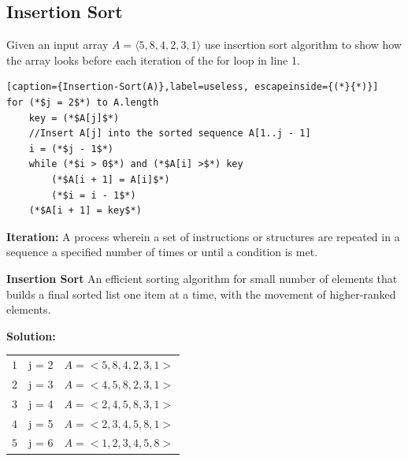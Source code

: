 \documentclass[11pt,fleqn]{book}
\begin{document}
\subsection{Insertion Sort}
\begin{example}
Given an input array $A = \langle 5,8,4,2,3,1 \rangle$ use insertion sort  algorithm to show how the array looks before each iteration of the for loop in line 1. 
\end{example}
\vspace{1em}
\begin{lstlisting}[caption={Insertion-Sort(A)},label=useless, escapeinside={(*}{*)}]
for (*$j = 2$*) to A.length
    key = (*$A[j]$*)
    //Insert A[j] into the sorted sequence A[1..j - 1]
    i = (*$j - 1$*)
    while (*$i > 0$*) and (*$A[i] >$*) key
        (*$A[i + 1] = A[i]$*)
        (*$i = i - 1$*)
    (*$A[i + 1] = key$*)
\end{lstlisting}
\begin{definition}
\textbf{Iteration:} A process wherein a set of instructions or structures are repeated in a sequence a specified number of times or until a condition is met.
\end{definition}
\begin{definition} 
\textbf{Insertion Sort} An efficient sorting algorithm for small number of elements that builds a final sorted list one item at a time, with the movement of higher-ranked elements. 
\end{definition} 
\vspace{1em}
\textbf{Solution: } 
\begin{center}
     \begin{tabular}{c|c|c}
               $1$ & j = 2 & $A = <5,8,4,2,3,1>$ \\
               $2$ & j = 3 & $A = <4,5,8,2,3,1>$ \\
               $3$ & j = 4 & $A = <2,4,5,8,3,1>$ \\
               $4$ & j = 5 & $A = <2,3,4,5,8,1>$ \\
               $5$ & j = 6 & $A = <1,2,3,4,5,8>$
            \end{tabular}
\end{center}
\end{document}
